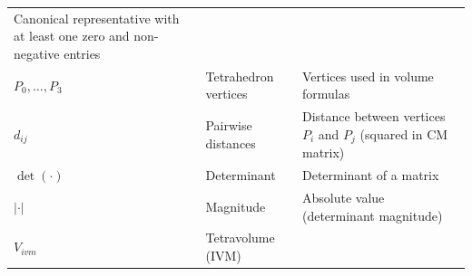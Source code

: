 \documentclass[
  10pt,
]{article}
\begin{document}
\begin{longtable}[]{@{}lll@{}}
\begin{minipage}[t]{0.30\columnwidth}
Canonical representative with at least one zero and non-negative
entries\strut
\end{minipage}\tabularnewline
\begin{minipage}[t]{0.30\columnwidth}\raggedright
\(P_0,\ldots,P_3\)\strut
\end{minipage} & \begin{minipage}[t]{0.30\columnwidth}\raggedright
Tetrahedron vertices\strut
\end{minipage} & \begin{minipage}[t]{0.30\columnwidth}\raggedright
Vertices used in volume formulas\strut
\end{minipage}\tabularnewline
\begin{minipage}[t]{0.30\columnwidth}\raggedright
\(d_{ij}\)\strut
\end{minipage} & \begin{minipage}[t]{0.30\columnwidth}\raggedright
Pairwise distances\strut
\end{minipage} & \begin{minipage}[t]{0.30\columnwidth}\raggedright
Distance between vertices \(P_i\) and \(P_j\) (squared in CM
matrix)\strut
\end{minipage}\tabularnewline
\begin{minipage}[t]{0.30\columnwidth}\raggedright
\(\det(\cdot)\)\strut
\end{minipage} & \begin{minipage}[t]{0.30\columnwidth}\raggedright
Determinant\strut
\end{minipage} & \begin{minipage}[t]{0.30\columnwidth}\raggedright
Determinant of a matrix\strut
\end{minipage}\tabularnewline
\begin{minipage}[t]{0.30\columnwidth}\raggedright
\(\lvert\cdot\rvert\)\strut
\end{minipage} & \begin{minipage}[t]{0.30\columnwidth}\raggedright
Magnitude\strut
\end{minipage} & \begin{minipage}[t]{0.30\columnwidth}\raggedright
Absolute value (determinant magnitude)\strut
\end{minipage}\tabularnewline
\begin{minipage}[t]{0.30\columnwidth}\raggedright
\(V_{ivm}\)\strut
\end{minipage} & \begin{minipage}[t]{0.30\columnwidth}\raggedright
Tetravolume (IVM)\strut

\end{minipage}
\end{longtable}
\end{document}
